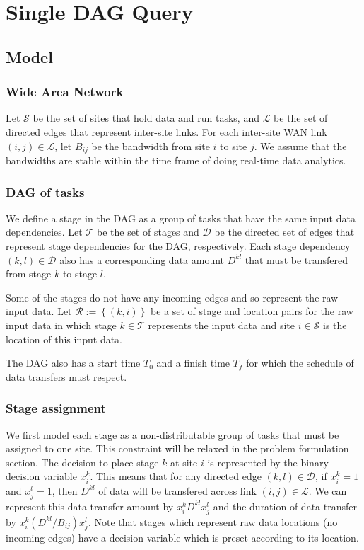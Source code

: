 \section{Single DAG Query}

\subsection{Model}

\subsubsection*{Wide Area Network}

Let $\mathcal{S}$ be the set of sites that hold data and run tasks, and $\mathcal{L}$ be the set of directed edges that represent inter-site links.
For each inter-site WAN link $(i,j)\in\mathcal{L}$, let $B_{ij}$ be the bandwidth from site $i$ to site $j$.
We assume that the bandwidths are stable within the time frame of doing real-time data analytics.

\subsubsection*{DAG of tasks}

We define a stage in the DAG as a group of tasks that have the same input data dependencies.
Let $\mathcal{T}$ be the set of stages and $\mathcal{D}$ be the directed set of edges that represent stage dependencies for the DAG, respectively.
Each stage dependency $(k,l)\in\mathcal{D}$ also has a corresponding data amount $D^{kl}$ that must be transfered from stage $k$ to stage $l$.

Some of the stages do not have any incoming edges and so represent the raw input data.
Let $\mathcal{R}:=\left\{(k,i)\right\}$ be a set of stage and location pairs for the raw input data in which stage $k\in\mathcal{T}$ represents the input data and site $i\in\mathcal{S}$ is the location of this input data.

The DAG also has a start time $T_0$ and a finish time $T_f$ for which the schedule of data transfers must respect.

\subsubsection*{Stage assignment}

We first model each stage as a non-distributable group of tasks that must be assigned to one site.
This constraint will be relaxed in the problem formulation section.
The decision to place stage $k$ at site $i$ is represented by the binary decision variable $x_i^k$.
This means that for any directed edge $(k,l)\in\mathcal{D}$, if $x_i^k=1$ and $x_j^l=1$, then $D^{kl}$ of data will be transfered across link $(i,j)\in\mathcal{L}$.
We can represent this data transfer amount by $x_i^kD^{kl}x_j^l$ and the duration of data transfer by $x_i^k(D^{kl}/B_{ij})x_j^l$.
Note that stages which represent raw data locations (no incoming edges) have a decision variable which is preset according to its location.

